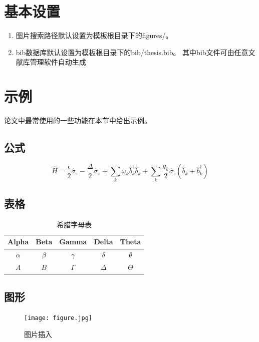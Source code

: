 \documentclass{LZUthesis}
\begin{document}
\section{基本设置}
\begin{enumerate}
\item 图片搜索路径默认设置为模板根目录下的figures/。
\item bib数据库默认设置为模板根目录下的bib/thesis.bib。 其中bib文件可由任意文献库管理软件自动生成
\end{enumerate}


\section{示例}
论文中最常使用的一些功能在本节中给出示例。

\subsection{公式}
\begin{equation}
\hat{H}=\frac{\epsilon}{2}\hat{\sigma}_{z}-\frac{\Delta}{2}\hat{\sigma}_{x}+\sum_{k}\omega_{k}\hat{b}_{k}^{\dagger}\hat{b}_{k}+\sum_{k}\frac{g_{k}}{2}\hat{\sigma}_{z}(\hat{b}_{k}+\hat{b}_{k}^{\dagger})\label{eq:sbm}
\end{equation}


\subsection{表格}
\begin{table}[H]
\begin{centering}
\begin{tabular}{|c|c|c|c|c|}
\hline
Alpha & Beta & Gamma & Delta & Theta\\
\hline
$\alpha$ & $\beta$ & $\gamma$ & $\delta$ & $\theta$\\
\hline
$A$ & $B$ & $\Gamma$ & $\Delta$ & $\Theta$\\
\hline
\end{tabular}
\par\end{centering}
\protect\caption{希腊字母表\label{tab:Greek}}
\end{table}


\subsection{图形}

\begin{figure}[H]
\begin{centering}
\texttt{[image: figure.jpg]}\\
\end{centering}
\protect\caption{ 图片插入\label{fig:fig}}
\end{figure}
\end{document}
